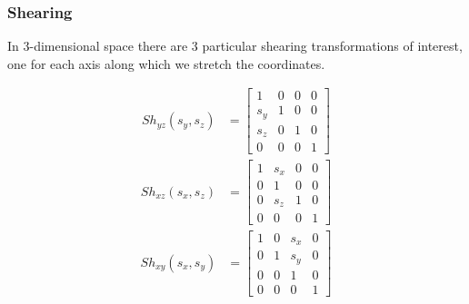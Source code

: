 \documentclass[11pt]{article}
\begin{document}
\subsubsection{Shearing}
In 3-dimensional space there are 3 particular shearing transformations of
interest, one for each axis along which we stretch the coordinates.
\vspace{-0.25in}
\scriptsize
\begin{multicols}{3}
    \begin{align}
        Sh_{yz}(s_y, s_z) &=
        \begin{bmatrix}
            1   & 0     & 0     & 0 \\
            s_y & 1     & 0     & 0 \\
            s_z & 0     & 1     & 0 \\
            0   & 0     & 0     & 1
        \end{bmatrix}
    \end{align}
    \vfill\columnbreak
    \begin{align}
        Sh_{xz}(s_x, s_z) &=
        \begin{bmatrix}
            1   & s_x   & 0     & 0 \\
            0   & 1     & 0     & 0 \\
            0   & s_z   & 1     & 0 \\
            0   & 0     & 0     & 1
        \end{bmatrix}
    \end{align}
    \vfill\columnbreak
    \begin{align}
        Sh_{xy}(s_x, s_y) &=
        \begin{bmatrix}
            1   & 0     & s_x   & 0 \\
            0   & 1     & s_y   & 0 \\
            0   & 0     & 1     & 0 \\
            0   & 0     & 0     & 1
        \end{bmatrix}
    \end{align}
    \vspace*{\fill}
\end{multicols}
\normalsize
\vspace{-0.40in}
\end{document}
